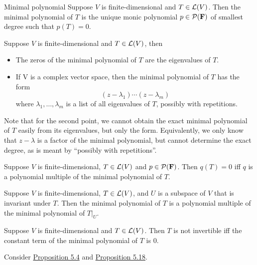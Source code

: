 \documentclass[12pt,a4paper]{article}
\begin{document}
    \begin{defi}{Minimal polynomial}
        Suppose $V$ is finite-dimensional and $T\in\mathcal{L}(V)$. Then the minimal polynomial of $T$ is the unique monic polynomial $p\in\mathcal{P}(\mathbf{F})$ of smallest degree such that $p(T)=0$.
    \end{defi}
    \hfill

    \begin{prop}\label{5.18}
        Suppose $V$ is finite-dimensional and $T\in\mathcal{L}(V)$, then
        \begin{itemize}
            \item The zeros of the minimal polynomial of $T$ are the eigenvalues of $T$.
            \item If V is a complex vector space, then the minimal polynomial of $T$ has the form
            $$
            (z-\lambda_1)\cdots(z-\lambda_m)
            $$
            where $\lambda_1,\dots,\lambda_m$ is a list of all eigenvalues of $T$, possibly with repetitions.
        \end{itemize}
    \end{prop}
    \begin{remark}
        Note that for the second point, we cannot obtain the exact minimal polynomial of $T$ easily from its eigenvalues, but only the form. Equivalently, we only know that $z-\lambda$ is a factor of the minimal polynomial, but cannot determine the exact degree, as is meant by “possibly with repetitions”.
    \end{remark}
    \hfill

    \begin{prop}
        Suppose $V$ is finite-dimensional, $T\in\mathcal{L}(V)$ and $p\in\mathcal{P}(\mathbf{F})$. Then $q(T)=0$ iff $q$ is a polynomial multiple of the minimal polynomial of $T$.
    \end{prop}
    \begin{cor}
        Suppose $V$ is finite-dimensional, $T\in\mathcal{L}(V)$, and $U$ is a subspace of $V$ that is invariant under $T$. Then the minimal polynomial of $T$ is a polynomial multiple of the minimal polynomial of $T|_{U}$.
    \end{cor}
    \hfill

    \begin{prop}
        Suppose $V$ is finite-dimensional and $T\in\mathcal{L}(V)$. Then $T$ is not invertible iff the constant term of the minimal polynomial of $T$ is $0$.
    \end{prop}
    \begin{remark}
        Consider \hyperref[5.4]{Proposition 5.4} and \hyperref[5.18]{Proposition 5.18}.
    \end{remark}
    \hfill
\end{document}
